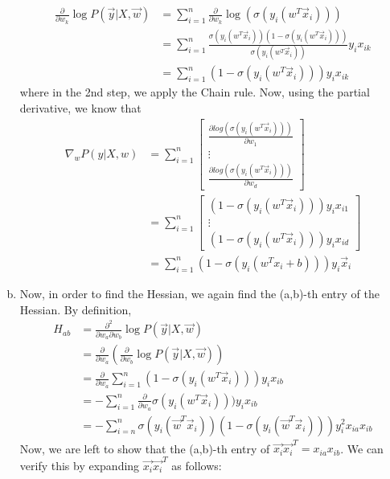 \documentclass{article}
\begin{document}
\begin{enumerate}[(a)]
    \begin{align*}
	    \frac{\partial}{\partial w_k}\log P(\vec{y} | X, \vec{w}) &= \sum_{i=1}^n \frac{\partial}{\partial w_k}  \log( \sigma(y_i(w^T\vec{x}_i))) \\
	    &= \sum_{i=1}^{n} \frac{\sigma(y_i(w^T\vec{x}_i)) (1 -\sigma(y_i(w^T\vec{x}_i)))}{\sigma(y_i(w^T\vec{x}_i))} y_i x_{ik}\\
	    &= \sum_{i=1}^n (1-\sigma(y_i(w^T\vec{x}_i))) y_i x_{ik}
    \end{align*}
    where in the 2nd step, we apply the Chain rule. Now, using the partial derivative, we know that 
    \begin{align*}
    	\nabla_w P(y|X,w) &=\sum_{i=1}^n
    	\begin{bmatrix}
    	\frac{\partial log( \sigma(y_i(w^T\vec{x}_i)))}{\partial w_1}  \\
    	\vdots \\
    	\frac{\partial log( \sigma(y_i(w^T\vec{x}_i)))}{\partial w_d}
    	\end{bmatrix} \\
    	& = \sum_{i=1}^n
    	\begin{bmatrix}
    	 (1-\sigma(y_i(w^T\vec{x}_i))) y_i x_{i1}\\
    	\vdots \\
    	 (1-\sigma(y_i(w^T\vec{x}_i))) y_i x_{id}
    	\end{bmatrix} \\
    	& = \sum_{i=1}^n (1-\sigma(y_i(w^Tx_i + b))) y_i \vec{x}_i
    \end{align*}
	  
	 \item Now, in order to find the Hessian, we again find the (a,b)-th entry of the Hessian. By definition, 
	 \begin{align*}
	 	H_{ab} &= \frac{\partial^2}{\partial w_a \partial w_b} \log P(\vec{y} | X, \vec{w}) \\
	 	       &= \frac{\partial}{\partial w_a} \left(\frac{\partial}{\partial w_b} \log P(\vec{y} | X, \vec{w}) \right)\\
	 	       &= \frac{\partial}{\partial w_a} \sum_{i=1}^n (1-\sigma(y_i(w^T\vec{x}_i))) y_i x_{ib} \\
	 	       &= - \sum_{i=1}^{n} \frac{\partial}{\partial w_a}\sigma(y_i(w^T\vec{x}_i))) y_i x_{ib} \\
	 	       &= -\sum_{i = n}^{n} \sigma(y_i(\vec{w}^T\vec{x}_i))(1 - \sigma(y_i(\vec{w}^T\vec{x}_i)))y_i^2 x_{ia}x_{ib}
	 \end{align*}
	    Now, we are left to show that the (a,b)-th entry of $\vec{x_i}\vec{x_i}^T = x_{ia}x_{ib}$. We can verify this by expanding $\vec{x_i}\vec{x_i}^T$ as follows: 
	    

\end{enumerate}
\end{document}
